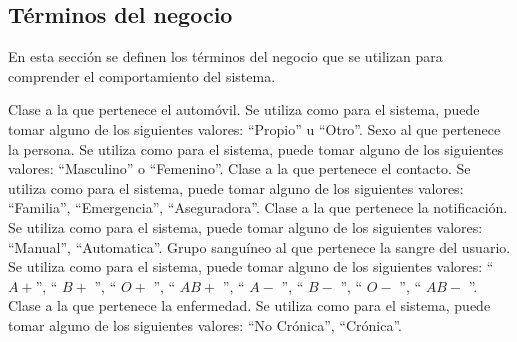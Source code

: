 \subsection{Términos del negocio}
\label{gls:terminosNegocio}
En esta sección se definen los términos del negocio que se utilizan para comprender el comportamiento del sistema.

\begin{description}
    
     Clase a la que pertenece el automóvil. Se utiliza como  para el sistema, puede tomar alguno de los siguientes valores: ``Propio'' u ``Otro''.
     Sexo al que pertenece la persona. Se utiliza como  para el sistema, puede tomar alguno de los siguientes valores: ``Masculino'' o ``Femenino''.
 	 Clase a la que pertenece el contacto. Se utiliza como  para el sistema, puede tomar alguno de los siguientes valores: ``Familia'', ``Emergencia'', ``Aseguradora''.
 	 Clase a la que pertenece la notificación. Se utiliza como  para el sistema, puede tomar alguno de los siguientes valores: ``Manual'', ``Automatica''.
 	 Grupo sanguíneo al que pertenece la sangre del usuario. Se utiliza como  para el sistema, puede tomar alguno de los siguientes valores: ``$A+$'', `` $B+$ '', `` $O+$ '', `` $AB+$ '', `` $A-$ '', `` $B-$ '', `` $O-$ '', `` $AB-$ ''.
 	 Clase a la que pertenece la enfermedad. Se utiliza como  para el sistema, puede tomar alguno de los siguientes valores: ``No Crónica'', ``Crónica''.
 	
 	


   
\end{description}
